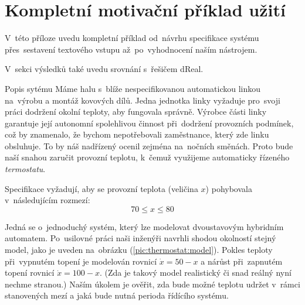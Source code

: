 \documentclass[thesis=M,czech]{FITthesis}[2012/06/26]
\newcommand{\id}[1]{\texttt{#1}}
\newcommand{\hl}[1]{\textit{#1}}
\newcommand{\rf}[1]{\ref{#1}}
\newcommand{\der}[1]{\ensuremath{\dot{#1}}}
\newcommand{\picFn}[1]{../img/#1}
\newcommand{\picL}{pic}
\newcommand{\rfPic}[1]{(\rf{\picL:#1})}
\newcommand{\pic}[5]{
\begin{figure}
{\centering
\texttt{[image: \\picFn\{\#1]}}
\caption{#4}
\label{\picL:#2}
}\smallskip
#5
\end{figure}
}
\newcommand{\tabL}{tab}
\newcommand{\rfTab}[1]{(\rf{\tabL:#1})}
\begin{document}


\chapter{Kompletní motivační příklad užití}\label{appendix:example}
V~této příloze uvedu kompletní příklad
od~návrhu specifikace systému
přes~sestavení textového vstupu
až~po~vyhodnocení naším nástrojem.

V~sekci výsledků také uvedu srovnání s~řešičem dReal.


\begin{section}{Popis sytému}\label{s:example:spec}
Máme halu s~blíže nespecifikovanou automatickou linkou
na~výrobu a montáž kovových dílů.
Jedna jednotka linky vyžaduje pro~svoji práci
dodržení okolní teploty, aby fungovala správně.
Výrobce části linky garantuje její
autonomní spolehlivou činnost při~dodržení provozních podmínek,
což by znamenalo, že bychom nepotřebovali
zaměstnance, který zde linku obsluhuje.
To by náš nadřízený ocenil zejména na~nočních směnách.
Proto bude naší snahou zaručit
provozní teplotu, k~čemuž využijeme
automaticky řízeného \hl{termostatu}.

Specifikace vyžadují, aby se provozní teplota
(veličina $x$) pohybovala v~následujícím rozmezí:
\[
   70 \leq x \leq 80
\]

Jedná se o~jednoduchý systém,
který lze modelovat dvoustavovým hybridním automatem.
Po~usilovné práci naši inženýři navrhli
shodou okolností stejný model,
jako je uveden na~obrázku \rfPic{thermostat:model}.
Pokles teploty při~vypnutém topení
je modelován rovnicí $\der{x} = 50 - x$
a nárůst při~zapnutém topení rovnicí $\der{x} = 100 - x$.
(Zda je takový model realistický či snad reálný
nyní nechme stranou.)
Naším úkolem je ověřit,
zda bude možné teplotu udržet v~rámci stanovených mezí
a jaká bude nutná perioda řídícího systému.
\end{section} %
\end{document}
